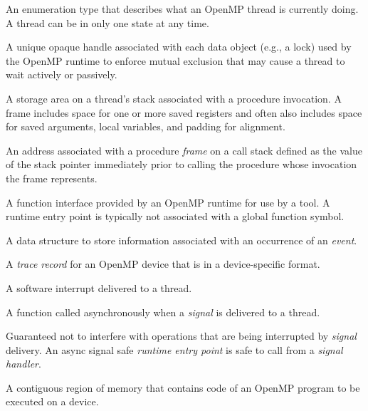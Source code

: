 \glossarydefstart
An enumeration type that describes what an OpenMP thread is currently doing.
A thread can be in only one state at any time.
\glossarydefend

\glossarydefstart
A unique opaque handle associated with each data object (e.g., a lock) used by the OpenMP runtime
to enforce mutual exclusion that may cause a thread to wait actively or passively.
\glossarydefend

\glossarydefstart
A storage area on a thread's stack associated with a procedure invocation. A frame includes space for
one or more saved registers and often also includes space for saved arguments, local variables,
and padding for alignment.
\glossarydefend

\glossarydefstart
An address associated with a procedure \emph{frame} on a call stack defined as the value of the stack pointer immediately prior
to calling the procedure whose invocation the frame represents.
\glossarydefend

\glossarydefstart
A function interface provided by an OpenMP runtime for use by a tool. A runtime entry point is
typically not associated with a global function symbol.
\glossarydefend

\glossarydefstart
A data structure to store information associated with an occurrence of an \emph{event}.
\glossarydefend

\glossarydefstart
A \emph{trace record} for an OpenMP device that is in a device-specific format.
\glossarydefend

\glossarydefstart
A software interrupt delivered to a thread.
\glossarydefend

\glossarydefstart
A function called asynchronously when a \emph{signal} is delivered to a thread.
\glossarydefend

\glossarydefstart
Guaranteed not to interfere with operations that are being interrupted by \emph{signal} delivery.
An async signal safe \emph{runtime entry point} is safe to call from a \emph{signal handler}.
\glossarydefend

\glossarydefstart
A contiguous region of memory that contains code of an OpenMP program to be executed on a device.
\glossarydefend


